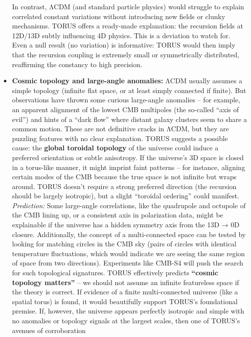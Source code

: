 \documentclass[]{article}
\begin{document}
\begin{itemize}
  In contrast, ΛCDM (and standard particle physics) would struggle to
  explain correlated constant variations without introducing new fields
  or clunky mechanisms. TORUS offers a ready-made explanation: the
  recursion fields at 12D/13D subtly influencing 4D physics​. This is a
  deviation to watch for. Even a null result (no variation) is
  informative: TORUS would then imply that the recursion coupling is
  extremely small or symmetrically distributed, reaffirming the
  constancy to high precision.
\item
  \textbf{Cosmic topology and large-angle anomalies:} ΛCDM usually
  assumes a simple topology (infinite flat space, or at least simply
  connected if finite). But observations have thrown some curious
  large-angle anomalies -- for example, an apparent alignment of the
  lowest CMB multipoles (the so-called ``axis of evil'') and hints of a
  ``dark flow'' where distant galaxy clusters seem to share a common
  motion. These are not definitive cracks in ΛCDM, but they are puzzling
  features with no clear explanation. TORUS suggests a possible cause:
  the \textbf{global toroidal topology} of the universe could induce a
  preferred orientation or subtle anisotropy. If the universe's 3D space
  is closed in a torus-like manner, it might imprint faint patterns --
  for instance, aligning certain modes of the CMB because the true space
  is not infinite but wraps around. TORUS doesn't require a strong
  preferred direction (the recursion should be largely isotropic), but a
  slight ``toroidal ordering'' could manifest. \emph{Prediction:} Some
  large-angle correlations, like the quadrupole and octupole of the CMB
  lining up, or a consistent axis in polarization data, might be
  explainable if the universe has a hidden symmetry axis from the 13D →
  0D closure​. Additionally, the concept of a multi-connected space can
  be tested by looking for matching circles in the CMB sky (pairs of
  circles with identical temperature fluctuations, which would indicate
  we are seeing the same region of space from two directions).
  Experiments like CMB-S4 will push the search for such topological
  signatures​. TORUS effectively predicts \textbf{``cosmic topology
  matters''} -- we should not assume an infinite featureless space if
  the theory is correct. If evidence of a finite multi-connected
  universe (like a spatial torus) is found, it would beautifully support
  TORUS's foundational premise. If, however, the universe appears
  perfectly isotropic and simple with no anomalies or topology signals
  at the largest scales, then one of TORUS's avenues of corroboration

\end{itemize}
\end{document}

